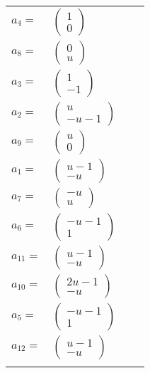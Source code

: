 \documentclass[1p]{elsarticle_modified}
\theoremstyle{definition}
\begin{document}
\begin{tabular}{m{7pt} m{180pt} m{7pt} m{180pt} }
\flushright $a_{4}=$&$\begin{pmatrix}1\\0\end{pmatrix}$ \\
\flushright $a_{8}=$&$\begin{pmatrix}0\\u\end{pmatrix}$ \\
\flushright $a_{3}=$&$\begin{pmatrix}1\\-1\end{pmatrix}$ \\
\flushright $a_{2}=$&$\begin{pmatrix}u\\- u-1\end{pmatrix}$ \\
\flushright $a_{9}=$&$\begin{pmatrix}u\\0\end{pmatrix}$ \\
\flushright $a_{1}=$&$\begin{pmatrix}u-1\\- u\end{pmatrix}$ \\
\flushright $a_{7}=$&$\begin{pmatrix}- u\\u\end{pmatrix}$ \\
\flushright $a_{6}=$&$\begin{pmatrix}- u-1\\1\end{pmatrix}$ \\
\flushright $a_{11}=$&$\begin{pmatrix}u-1\\- u\end{pmatrix}$ \\
\flushright $a_{10}=$&$\begin{pmatrix}2 u-1\\- u\end{pmatrix}$ \\
\flushright $a_{5}=$&$\begin{pmatrix}- u-1\\1\end{pmatrix}$ \\
\flushright $a_{12}=$&$\begin{pmatrix}u-1\\- u\end{pmatrix}$\\&\end{tabular}
\end{document}
